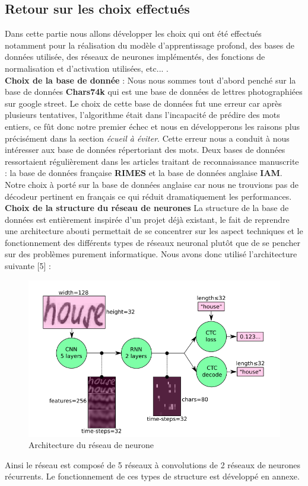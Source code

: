 \documentclass[oneside,a4paper,13pt]{article}
\begin{document}
\subsection{Retour sur les choix effectués}
Dans cette partie nous allons développer les choix qui ont été effectués notamment pour la réalisation du modèle d'apprentissage profond, des bases de données utilisée, des réseaux de neurones implémentés, des fonctions de normalisation et d'activation utilisées, etc... .\\
\medbreak
\textbf{Choix de la base de donnée} : Nous nous sommes tout d'abord penché sur la base de données \textbf{Chars74k} qui est une base de données de lettres photographiées sur google street. Le choix de cette base de données fut une erreur car après plusieurs tentatives, l'algorithme était dans l'incapacité de prédire des mots entiers, ce fût donc notre premier échec et nous en développerons les raisons plus précisément dans la section \textit{écueil à éviter}. Cette erreur nous a conduit à nous intéresser aux base de données répertoriant des mots. Deux bases de données ressortaient régulièrement dans les articles traitant de reconnaissance manuscrite : la base de données française \textbf{RIMES} et la base de données anglaise \textbf{IAM}. Notre choix à porté sur la base de données anglaise car nous ne trouvions pas de décodeur pertinent en français ce qui réduit dramatiquement les performances.
\medbreak
\textbf{Choix de la structure du réseau de neurones}
La structure de la base de données est entièrement inspirée d'un projet déjà existant, le fait de reprendre une architecture abouti permettait de se concentrer sur les aspect techniques et le fonctionnement des différents types de réseaux neuronal plutôt que de se pencher sur des problèmes purement informatique. Nous avons donc utilisé l'architecture suivante [5] :
\begin{figure}[H]
    \centering
        \includegraphics[width=0.8\linewidth]{Images/architecture.PNG}
        \caption{Architecture du réseau de neurone}
        \label{fig:my_label}
\end{figure}
Ainsi le réseau est composé de 5 réseaux à convolutions de 2 réseaux de neurones récurrents. Le fonctionnement de ces types de structure est développé en annexe.
\medbreak
\end{document}
